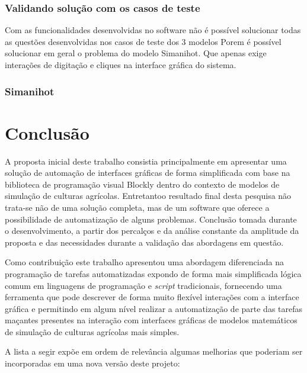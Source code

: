 \documentclass[tg]{mdtufsm}
\begin{document}
    \subsection {Validando solução com os casos de teste}

    Com as funcionalidades desenvolvidas no software não é possível solucionar todas as questões desenvolvidas nos casos de teste dos 3 modelos Porem é possível solucionar em geral o problema do modelo Simanihot. Que apenas exige interações de digitação e cliques na interface gráfica do sistema.

    \subsection {Simanihot}

    \chapter {Conclusão}

    A proposta inicial deste trabalho consistia principalmente em apresentar uma solução de automação de interfaces gráficas de forma simplificada com base na biblioteca de programação visual Blockly dentro do contexto de modelos de simulação de culturas agrícolas. Entretantoo resultado final desta pesquisa não trata-se não de uma solução completa, mas de um software que oferece a possibilidade de automatização de alguns problemas. Conclusão tomada durante o desenvolvimento, a partir dos percalços e da análise constante da amplitude da proposta e das necessidades durante a validação das abordagens em questão.

    Como contribuição este trabalho apresentou uma abordagem diferenciada na programação de tarefas automatizadas expondo de forma mais simplificada lógica comum em linguagens de programação e \emph{script} tradicionais, fornecendo uma ferramenta que pode descrever de forma muito flexível interações com a interface gráfica e permitindo em algum nível realizar a automatização de parte das tarefas maçantes presentes na interação com interfaces gráficas de modelos matemáticos de simulação de culturas agrícolas mais simples.

    A lista a segir expõe em ordem de relevância algumas melhorias que poderiam ser incorporadas em uma nova versão deste projeto:
\end{document}
